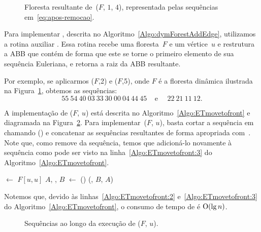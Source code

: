 \begin{figure}[htb]
\centering

\caption{Floresta resultante de~\dymForestDelEdge($F$, $1$, $4$), representada pelas sequências em~\eqref{eq:apos-remocao}.}
\label{fig:algorit-del-pos}
\end{figure}

Para implementar \dymForestAddEdge{}, descrita no Algoritmo~\ref{Algo:dymForestAddEdge}, utilizamos a rotina auxiliar \ETmovetofront{}.
Essa rotina recebe uma floresta~$F$ e um vértice~$u$ e restrutura a ABB que contém  de forma que este se torne o primeiro elemento de sua sequência Euleriana, e retorna a raiz da ABB resultante. 

Por exemplo, se aplicarmos \ETmovetofront($F$,2) e \ETmovetofront($F$,5), onde $F$ é a floresta dinâmica ilustrada na Figura~\ref{fig:algorit-del-pos}, obtemos as sequências:
\begin{equation}
55~54~40~03~33~30~00~04~44~45~~~~~\text{e}~~~~~~22~21~11~12.\label{eq:apos-moveToFront}
\end{equation}

A implementação de \ETmovetofront($F$, $u$) está descrita no Algoritmo~\ref{Algo:ETmovetofront} e diagramada na Figura~\ref{fig:algorit-move-to-front}.
Para implementar~\ETmovetofront($F$, $u$), basta cortar a sequência em  chamando \treapSplit() e concatenar as sequências resultantes de forma apropriada com~\treapJoin{}.
Note que, como \treapSplit{} remove  da sequência, temos que adicioná-lo novamente à sequência como pode ser visto na linha~\ref{Algo:ETmovetofront:3} do Algoritmo~\ref{Algo:ETmovetofront}.

\newpage
\begin{algorithm}[htb]
\caption{\ETmovetofront($F$, $u$)}
\label{Algo:ETmovetofront}
\begin{algorithmic}[1]
\State {} $\gets$ $F[u,u]$\label{Algo:ETmovetofront:1}
\State $A$, , $B$ $\gets$ \treapSplit()\label{Algo:ETmovetofront:2}
\State \Return \treapJoin(, $B$, $A$)\label{Algo:ETmovetofront:3}
\end{algorithmic}
\end{algorithm}

Notemos que, devido às linhas~\ref{Algo:ETmovetofront:2} e~\ref{Algo:ETmovetofront:3} do Algoritmo~\ref{Algo:ETmovetofront}, o consumo de tempo de \ETmovetofront{} é $\mathrm{O}(\lg n)$.

\begin{figure}[htb]
\centering

\caption{Sequências ao longo da execução de \ETmovetofront($F$, $u$).}
\label{fig:algorit-move-to-front}
\end{figure}

